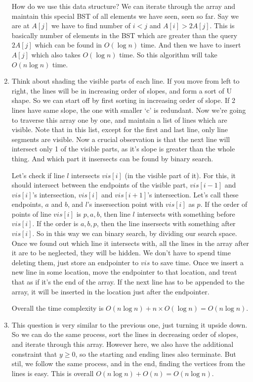 \documentclass[12pt]{report}
\begin{document}
\begin{enumerate}[label=\textbf{\arabic*.}]
  How do we use this data structure? We can iterate through the array and maintain this special BST of all elements we have seen, 
  seen so far. Say we are at $A[j]$ we have to find number of $i < j$ and $A[i] > 2A[j]$. This is basically number of elements in the 
  BST which are greater than the query $2A[j]$ which can be found in $O(\log n)$ time. And then we have to insert $A[j]$ which also takes
  $O(\log n)$ time.
  So this algorithm will take $O(n \log n)$ time.

  \item Think about shading the visible parts of each line. If you move from left to right, the lines will be in increasing order of slopes,
  and form a sort of U shape. So we can start off by first sorting in increasing order of slope. If 2 lines have same slope, the one with 
  smaller `c' is redundant. Now we're going to traverse this array one by one, and maintain a list of lines which are visible. Note that in 
  this list, except for the first and last line, only line segments are visible. Now a crucial observation is that the next line will intersect
  only 1 of the visible parts, as it's slope is greater than the whole thing. And which part it insersects can be found by binary search. 
  
  Let's check if line $l$ intersects $vis[i]$ (in the visible part of it). For this, it should intersect between the endpoints of the visible
  part, $vis[i-1]$ and $vis[i]$'s intersection, $vis[i]$ and $vis[i+1]$'s intersection. Let's call these endpoints, $a$ and $b$, and $l$'s
  insersection point with $vis[i]$ as $p$. If the order of points of line $vis[i]$ is $p, a, b$, then line $l$ intersects with something 
  before $vis[i]$. If the order is $a, b, p$, then the line insersects with something after $vis[i]$. So in this way we can binary search, 
  by dividing our search space. Once we found out which line it intersects with, all the lines in the array after it are to be neglected, they
  will be hidden. We don't have to spend time deleting them, just store an endpointer to $vis$ to save time. Once we insert a new line in some 
  location, move the endpointer to that location, and treat that as if it's the end of the array. If the next line has to be appended to the 
  array, it will be inserted in the location just after the endpointer.
  
  Overall the time complexity is $O(n \log n) + n \times O(\log n) = O(n \log n)$.

  \item This question is very similar to the previous one, just turning it upside down. So we can do the same process, sort the lines in decreasing
  order of slopes, and iterate through this array. However here, we also have the additional constraint that $y \geq 0$, so the starting and ending
  lines also terminate. But stil, we follow the same process, and in the end, finding the vertices from the lines is easy. This is overall
  $O(n \log n) + O(n) = O(n \log n)$.


\end{enumerate}
\end{document}
